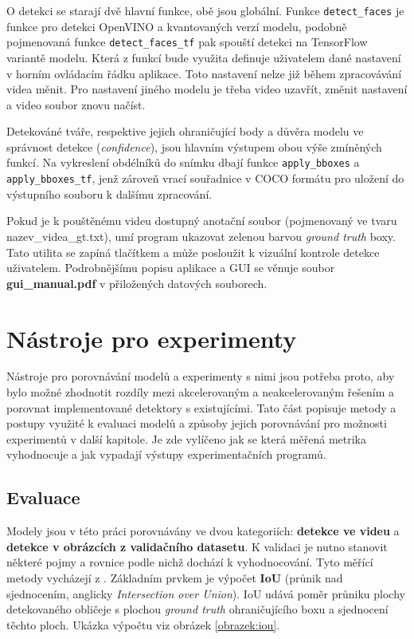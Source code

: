 O detekci se starají dvě hlavní funkce, obě jsou globální. Funkce \texttt{detect\_faces} je funkce pro detekci OpenVINO a kvantovaných verzí modelu, podobně pojmenovaná funkce \texttt{detect\_faces\_tf} pak spouští detekci na TensorFlow variantě modelu. Která z funkcí bude využita definuje uživatelem dané nastavení v horním ovládacím řádku aplikace. Toto nastavení nelze již během zpracovávání videa měnit. Pro nastavení jiného modelu je třeba video uzavřít, změnit nastavení a video soubor znovu načíst.

Detekováné tváře, respektive jejich ohraničující body a důvěra modelu ve správnost detekce (\emph{confidence}), jsou hlavním výstupem obou výše zmíněných funkcí. Na vykreslení obdélníků do snímku dbají funkce \texttt{apply\_bboxes} a \texttt{apply\_bboxes\_tf}, jenž zároveň vrací souřadnice v COCO formátu pro uložení do výstupního souboru k dalšímu zpracování.

Pokud je k pouštěnému videu dostupný anotační soubor (pojmenovaný ve tvaru nazev\_videa\_gt.txt), umí program ukazovat zelenou barvou \emph{ground truth} boxy. Tato utilita se zapíná tlačítkem  a může posloužit k vizuální kontrole detekce uživatelem. Podrobnějšímu popisu aplikace a GUI se věnuje soubor \textbf{gui\_manual.pdf} v přiložených datových souborech.

\section{Nástroje pro experimenty}
\label{sekce:nastroje_pro_experimenty}
Nástroje pro porovnávání modelů a experimenty s nimi jsou potřeba proto, aby bylo možné zhodnotit rozdíly mezi akcelerovaným a neakcelerovaným řešením a porovnat implementované detektory s existujícími.
Tato část popisuje metody a postupy využité k evaluaci modelů 
a způsoby jejich porovnávání pro možnosti experimentů v další kapitole. Je zde vylíčeno jak se která měřená metrika vyhodnocuje a jak vypadají výstupy experimentačních programů.


\subsection*{Evaluace}
Modely jsou v této práci porovnávány ve dvou kategoriích: \textbf{detekce ve videu} a \textbf{detekce v obrázcích z validačního datasetu}. K validaci je nutno stanovit některé pojmy a rovnice podle nichž dochází k vyhodnocování. Tyto měřící metody vycházejí z \cite{detekceMetriky}. Základním prvkem je výpočet \textbf{IoU} (průnik nad sjednocením, anglicky \emph{Intersection over Union}). IoU udává poměr průniku plochy detekovaného obličeje s plochou \emph{ground truth} ohraničujícího boxu a sjednocení těchto ploch. Ukázka výpočtu viz obrázek \ref{obrazek:iou}.

